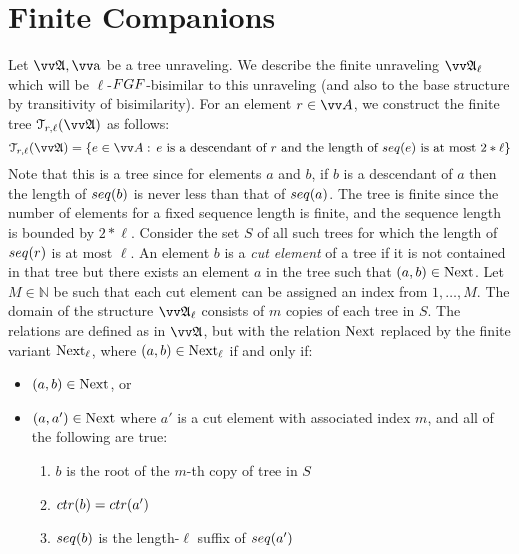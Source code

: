 
\section{Finite Companions}\label{sec:finite}
Let $\unravel{A}, \elemtuptuplea$ be a tree unraveling.
We describe the finite unraveling $\unravel{A}_{\ell}$ which will be $\ell$-$\FGF$-bisimilar to this unraveling (and also to the base structure by transitivity of bisimilarity).
For an element $r \in \unraveldom{A}$, we construct the finite tree $\mathcal{T}_{r,\ell}(\unravel{A})$ as follows:
\begin{equation*}
  \mathcal{T}_{r,\ell}(\unravel{A}) = \left\{ e \in \unraveldom{A}:\, e\ \text{is a descendant of $r$ and the length of $\seq{e}$ is at most $2 * \ell$} \right\}
\end{equation*}
Note that this is a tree since for elements $a$ and $b$, if $b$ is a descendant of $a$ then the length of $\seq{b}$ is never less than that of $\seq{a}$.
The tree is finite since the number of elements for a fixed sequence length is finite, and the sequence length is bounded by $2 * \ell$.
Consider the set $S$ of all such trees for which the length of $\seq{r}$ is at most $\ell$.
An element $b$ is a \emph{cut element} of a tree if it is not contained in that tree but there exists an element $a$ in the tree such that $(a,b) \in \mathrm{Next}$.
Let $M \in \mathbb{N}$ be such that each cut element can be assigned an index from $1, \ldots, M$.
The domain of the structure $\unravel{A}_{\ell}$ consists of $m$ copies of each tree in $S$.
The relations are defined as in $\unravel{A}$, but with the relation $\mathrm{Next}$ replaced by the finite variant $\mathrm{Next}_{\ell}$, where $(a,b) \in \mathrm{Next}_{\ell}$ if and only if:
\begin{itemize}
  \item $(a,b) \in \mathrm{Next}$, or
  \item $(a,a') \in \mathrm{Next}$ where $a'$ is a cut element with associated index $m$, and all of the following are true:
        \begin{enumerate}
          \item $b$ is the root of the $m$-th copy of tree in $S$
          \item $\ctr{b} = \ctr{a'}$
          \item $\seq{b}$ is the length-$\ell$ suffix of $\seq{a'}$
        \end{enumerate}
\end{itemize}


